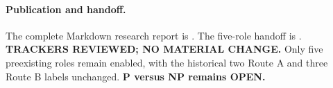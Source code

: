 \documentclass[11pt]{article}
\begin{document}
\paragraph{Publication and handoff.}
The complete Markdown research report is
.
The five-role handoff is
.
\textbf{TRACKERS REVIEWED; NO MATERIAL CHANGE.}
Only five preexisting roles remain enabled, with the historical
two Route A and three Route B labels unchanged.
\textbf{P versus NP remains OPEN.}
\end{document}
